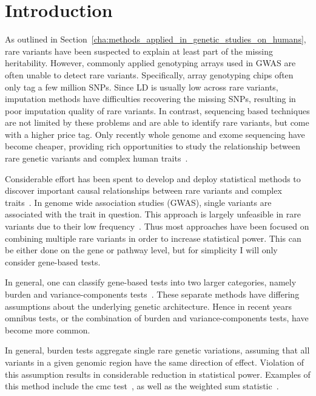 \section{Introduction}
\label{sec:introduction}

As outlined in Section~\ref{cha:methods_applied_in_genetic_studies_on_humans}, rare variants have been suspected to explain at least part of the missing heritability.
However, commonly applied genotyping arrays used in GWAS are often unable to detect rare variants.
Specifically, array genotyping chips often only tag a few million SNPs.
Since LD is usually low across rare variants, imputation methods have difficulties recovering the missing SNPs, resulting in poor imputation quality of rare variants.
In contrast, sequencing based techniques are not limited by these problems and are able to identify rare variants, but come with a higher price tag.
Only recently whole genome and exome sequencing have become cheaper, providing rich opportunities to study the relationship between rare genetic variants and complex human traits~\cite{Goodwin2016}.

Considerable effort has been spent to develop and deploy statistical methods to discover important causal relationships between rare variants and complex traits~\cite{Morris2010,Zeng2014,Daye2012,Manuscript2013}.
In genome wide association studies (GWAS), single variants are associated with the trait in question.
This approach is largely unfeasible in rare variants due to their low frequency~\cite{Lee2014}.
Thus most approaches have been focused on combining multiple rare variants in order to increase statistical power.
This can be either done on the gene or pathway level, but for simplicity I will only consider gene-based tests.

In general, one can classify gene-based tests into two larger categories, namely burden and variance-components tests~\cite{Lee2014}.
These separate methods have differing assumptions about the underlying genetic architecture.
Hence in recent years omnibus tests, or the combination of burden and variance-components tests, have become more common.

In general, burden tests aggregate single rare genetic variations, assuming that all variants in a given genomic region have the same direction of effect.
Violation of this assumption results in considerable reduction in statistical power.
Examples of this method include the \acrfull{cmc} test~\cite{Li2008}, as well as the weighted sum statistic~\cite{Madsen2009}.

